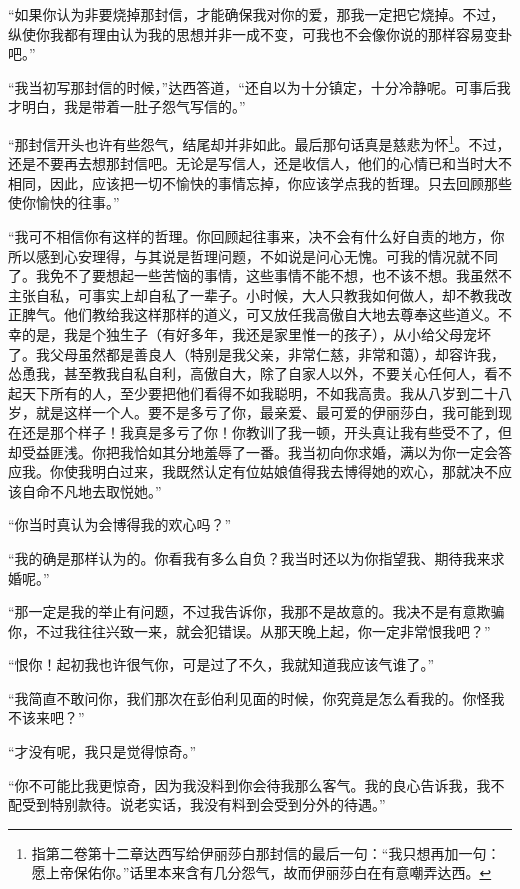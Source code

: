 \par “如果你认为非要烧掉那封信，才能确保我对你的爱，那我一定把它烧掉。不过，纵使你我都有理由认为我的思想并非一成不变，可我也不会像你说的那样容易变卦吧。”
\par “我当初写那封信的时候，”达西答道，“还自以为十分镇定，十分冷静呢。可事后我才明白，我是带着一肚子怨气写信的。”
\par “那封信开头也许有些怨气，结尾却并非如此。最后那句话真是慈悲为怀\footnote{指第二卷第十二章达西写给伊丽莎白那封信的最后一句：“我只想再加一句：愿上帝保佑你。”话里本来含有几分怨气，故而伊丽莎白在有意嘲弄达西。}。不过，还是不要再去想那封信吧。无论是写信人，还是收信人，他们的心情已和当时大不相同，因此，应该把一切不愉快的事情忘掉，你应该学点我的哲理。只去回顾那些使你愉快的往事。”
\par “我可不相信你有这样的哲理。你回顾起往事来，决不会有什么好自责的地方，你所以感到心安理得，与其说是哲理问题，不如说是问心无愧。可我的情况就不同了。我免不了要想起一些苦恼的事情，这些事情不能不想，也不该不想。我虽然不主张自私，可事实上却自私了一辈子。小时候，大人只教我如何做人，却不教我改正脾气。他们教给我这样那样的道义，可又放任我高傲自大地去尊奉这些道义。不幸的是，我是个独生子（有好多年，我还是家里惟一的孩子），从小给父母宠坏了。我父母虽然都是善良人（特别是我父亲，非常仁慈，非常和蔼），却容许我，怂恿我，甚至教我自私自利，高傲自大，除了自家人以外，不要关心任何人，看不起天下所有的人，至少要把他们看得不如我聪明，不如我高贵。我从八岁到二十八岁，就是这样一个人。要不是多亏了你，最亲爱、最可爱的伊丽莎白，我可能到现在还是那个样子！我真是多亏了你！你教训了我一顿，开头真让我有些受不了，但却受益匪浅。你把我恰如其分地羞辱了一番。我当初向你求婚，满以为你一定会答应我。你使我明白过来，我既然认定有位姑娘值得我去博得她的欢心，那就决不应该自命不凡地去取悦她。”
\par “你当时真认为会博得我的欢心吗？”
\par “我的确是那样认为的。你看我有多么自负？我当时还以为你指望我、期待我来求婚呢。”
\par “那一定是我的举止有问题，不过我告诉你，我那不是故意的。我决不是有意欺骗你，不过我往往兴致一来，就会犯错误。从那天晚上起，你一定非常恨我吧？”
\par “恨你！起初我也许很气你，可是过了不久，我就知道我应该气谁了。”
\par “我简直不敢问你，我们那次在彭伯利见面的时候，你究竟是怎么看我的。你怪我不该来吧？”
\par “才没有呢，我只是觉得惊奇。”
\par “你不可能比我更惊奇，因为我没料到你会待我那么客气。我的良心告诉我，我不配受到特别款待。说老实话，我没有料到会受到分外的待遇。”
